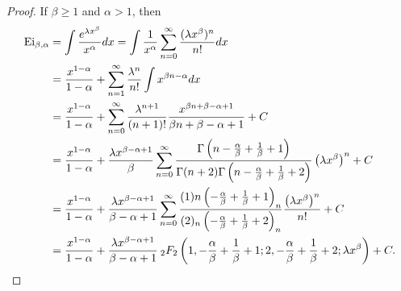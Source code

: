 \documentclass[smallextended]{svjour3}
\begin{document}
\begin{proof}
If $\beta\ge1$ and $\alpha>1$, then
\begin{align}
\text{Ei}_{\beta,\alpha}&=\int \frac{e^{\lambda x^\beta}}{x^\alpha}dx=\int\frac{1}{x^\alpha}\sum\limits_{n=0}^{\infty}\frac{(\lambda x^\beta)^n}{n!}dx
\nonumber\\ &=\frac{x^{1-\alpha}}{1-\alpha}+\sum\limits_{n=1}^{\infty}\frac{\lambda^n}{n!}\int x^{\beta n-\alpha}dx
\nonumber\\ &=\frac{x^{1-\alpha}}{1-\alpha}+\sum\limits_{n=0}^{\infty}\frac{\lambda^{n+1}}{(n+1)!}\frac{ x^{\beta n+\beta-\alpha+1}}{\beta n+\beta-\alpha+1}+C
\nonumber\\ &=\frac{x^{1-\alpha}}{1-\alpha}+\frac{\lambda x^{\beta-\alpha+1}}{\beta}\sum\limits_{n=0}^{\infty}\frac{\Gamma\left(n-\frac{\alpha}{\beta}+\frac{1}{\beta}+1\right)}{\Gamma(n+2)\Gamma\left(n-\frac{\alpha}{\beta}+\frac{1}{\beta}+2\right)}
\left(\lambda x^{\beta}\right)^n+C
\nonumber\\ &=\frac{x^{1-\alpha}}{1-\alpha}+\frac{\lambda x^{\beta-\alpha+1}}{\beta-\alpha+1}
\sum\limits_{n=0}^{\infty}\frac{(1)n\left(-\frac{\alpha}{\beta}+\frac{1}{\beta}+1\right)_n}{(2)_n\left(-\frac{\alpha}{\beta}+\frac{1}{\beta}+2\right)_n}\frac{ \left(\lambda x^{\beta}\right)^n}{n!}+C
\nonumber\\ &=\frac{x^{1-\alpha}}{1-\alpha}+\frac{\lambda x^{\beta-\alpha+1}}{\beta-\alpha+1}\hspace{.075cm}   _{2}F_{2}\left(1,-\frac{\alpha}{\beta}+\frac{1}{\beta}+1;2,-\frac{\alpha}{\beta}+\frac{1}{\beta}+2;\lambda x^\beta\right)+C.
\end{align}


\end{proof}
\end{document}
